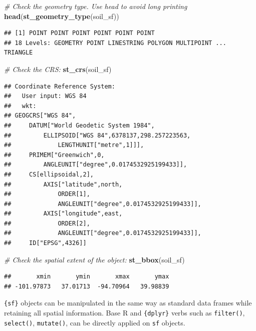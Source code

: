 \documentclass[
  10pt,
  b5paper,
  oneside]{book}
\newenvironment{Shaded}{\begin{snugshade}}{\end{snugshade}}
\newcommand{\CommentTok}[1]{\textcolor[rgb]{0.56,0.35,0.01}{\textit{#1}}}
\newcommand{\FunctionTok}[1]{\textcolor[rgb]{0.13,0.29,0.53}{\textbf{#1}}}
\newcommand{\NormalTok}[1]{#1}
\begin{document}
\begin{Shaded}
\begin{Highlighting}[]
\CommentTok{\# Check the geometry type. Use head to avoid long printing}
\FunctionTok{head}\NormalTok{(}\FunctionTok{st\_geometry\_type}\NormalTok{(soil\_sf))}
\end{Highlighting}
\end{Shaded}

\begin{verbatim}
## [1] POINT POINT POINT POINT POINT POINT
## 18 Levels: GEOMETRY POINT LINESTRING POLYGON MULTIPOINT ... TRIANGLE
\end{verbatim}

\begin{Shaded}
\begin{Highlighting}[]
\CommentTok{\# Check the CRS:}
\FunctionTok{st\_crs}\NormalTok{(soil\_sf)}
\end{Highlighting}
\end{Shaded}

\begin{verbatim}
## Coordinate Reference System:
##   User input: WGS 84 
##   wkt:
## GEOGCRS["WGS 84",
##     DATUM["World Geodetic System 1984",
##         ELLIPSOID["WGS 84",6378137,298.257223563,
##             LENGTHUNIT["metre",1]]],
##     PRIMEM["Greenwich",0,
##         ANGLEUNIT["degree",0.0174532925199433]],
##     CS[ellipsoidal,2],
##         AXIS["latitude",north,
##             ORDER[1],
##             ANGLEUNIT["degree",0.0174532925199433]],
##         AXIS["longitude",east,
##             ORDER[2],
##             ANGLEUNIT["degree",0.0174532925199433]],
##     ID["EPSG",4326]]
\end{verbatim}

\begin{Shaded}
\begin{Highlighting}[]
\CommentTok{\# Check the spatial extent of the object:}
\FunctionTok{st\_bbox}\NormalTok{(soil\_sf)}
\end{Highlighting}
\end{Shaded}

\begin{verbatim}
##       xmin       ymin       xmax       ymax 
## -101.97873   37.01713  -94.70964   39.98839
\end{verbatim}

\texttt{\{sf\}} objects can be manipulated in the same way as standard data frames while retaining all spatial information.
Base R and \texttt{\{dplyr\}} verbs such as \texttt{filter()}, \texttt{select()}, \texttt{mutate()}, can be directly applied on \texttt{sf} objects.
\end{document}
